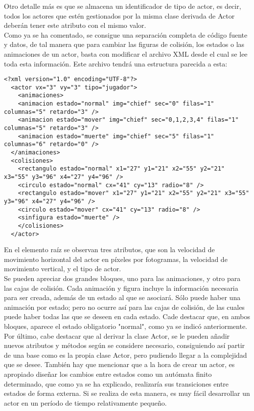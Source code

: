 Otro detalle más es que se almacena un identificador de tipo de actor, es decir, todos los actores que estén gestionados por la misma clase derivada de Actor deberán tener este atributo con el mismo valor.\\

Como ya se ha comentado, se consigue una separación completa de código fuente y datos, de tal manera que para cambiar las figuras de colisión, los estados o las animaciones de un actor, basta con modificar el archivo XML desde el cual se lee toda esta información. Este archivo tendrá una estructura parecida a esta:

\begin{lstlisting}[style=XML]
<?xml version="1.0" encoding="UTF-8"?>
  <actor vx="3" vy="3" tipo="jugador">
    <animaciones>
    <animacion estado="normal" img="chief" sec="0" filas="1" columnas="5" retardo="3" />
    <animacion estado="mover" img="chief" sec="0,1,2,3,4" filas="1" columnas="5" retardo="3" />
    <animacion estado="muerte" img="chief" sec="5" filas="1" columnas="6" retardo="0" />
  </animaciones>
  <colisiones>
    <rectangulo estado="normal" x1="27" y1="21" x2="55" y2="21" x3="55" y3="96" x4="27" y4="96" />
    <circulo estado="normal" cx="41" cy="13" radio="8" />
    <rectangulo estado="mover" x1="27" y1="21" x2="55" y2="21" x3="55" y3="96" x4="27" y4="96" />
    <circulo estado="mover" cx="41" cy="13" radio="8" />
    <sinfigura estado="muerte" />
    </colisiones>
  </actor>
\end{lstlisting}

En el elemento raíz se observan tres atributos, que son la velocidad de movimiento horizontal del actor en píxeles por fotogramas, la velocidad de movimiento vertical, y el tipo de actor.\\

Se pueden apreciar dos grandes bloques, uno para las animaciones, y otro para las cajas de colisión. Cada animación y figura incluye la información necesaria para ser creada, además de un estado al que se asociará. Sólo puede haber una animación por estado; pero no ocurre así para las cajas de colisión, de las cuales puede haber todas las que se deseen en cada estado. Cade destacar que, en ambos bloques, aparece el estado obligatorio "normal", como ya se indicó anteriormente.\\

Por último, cabe destacar que al derivar la clase Actor, se le pueden añadir nuevos atributos y métodos según se considere necesario, consiguiendo así partir de una base como es la propia clase Actor, pero pudiendo llegar a la complejidad que se desee. También hay que mencionar que a la hora de crear un actor, es apropiado diseñar los cambios entre estados como un autómata finito determinado, que como ya se ha explicado, realizaría sus transiciones entre estados de forma externa. Si se realiza de esta manera, es muy fácil desarrollar un actor en un período de tiempo relativamente pequeño.

